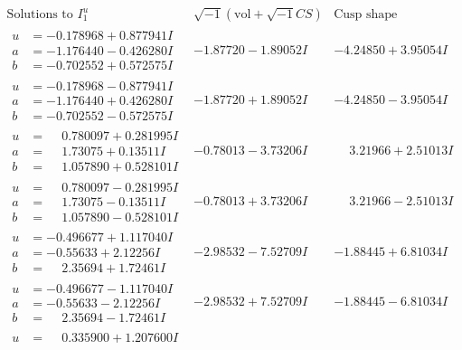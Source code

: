 \documentclass[1p]{elsarticle_modified}
\theoremstyle{definition}
\newcommand{\I}{\sqrt{-1}}
\begin{document}
$$\begin{array}{c|c|c}  
\text{Solutions to }I^u_{1}& \I (\text{vol} + \sqrt{-1}CS) & \text{Cusp shape}\\
 \hline 
\begin{aligned}
u &= -0.178968 + 0.877941 I \\
a &= -1.176440 - 0.426280 I \\
b &= -0.702552 + 0.572575 I\end{aligned}
 & -1.87720 - 1.89052 I & -4.24850 + 3.95054 I \\ \hline\begin{aligned}
u &= -0.178968 - 0.877941 I \\
a &= -1.176440 + 0.426280 I \\
b &= -0.702552 - 0.572575 I\end{aligned}
 & -1.87720 + 1.89052 I & -4.24850 - 3.95054 I \\ \hline\begin{aligned}
u &= \phantom{-}0.780097 + 0.281995 I \\
a &= \phantom{-}1.73075 + 0.13511 I \\
b &= \phantom{-}1.057890 + 0.528101 I\end{aligned}
 & -0.78013 - 3.73206 I & \phantom{-}3.21966 + 2.51013 I \\ \hline\begin{aligned}
u &= \phantom{-}0.780097 - 0.281995 I \\
a &= \phantom{-}1.73075 - 0.13511 I \\
b &= \phantom{-}1.057890 - 0.528101 I\end{aligned}
 & -0.78013 + 3.73206 I & \phantom{-}3.21966 - 2.51013 I \\ \hline\begin{aligned}
u &= -0.496677 + 1.117040 I \\
a &= -0.55633 + 2.12256 I \\
b &= \phantom{-}2.35694 + 1.72461 I\end{aligned}
 & -2.98532 - 7.52709 I & -1.88445 + 6.81034 I \\ \hline\begin{aligned}
u &= -0.496677 - 1.117040 I \\
a &= -0.55633 - 2.12256 I \\
b &= \phantom{-}2.35694 - 1.72461 I\end{aligned}
 & -2.98532 + 7.52709 I & -1.88445 - 6.81034 I \\ \hline\begin{aligned}
u &= \phantom{-}0.335900 + 1.207600 I \\

\end{aligned}
\end{array}$$
\end{document}
